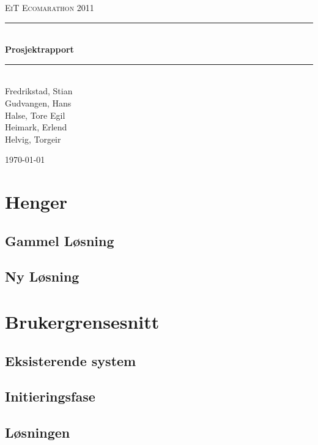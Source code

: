 \documentclass[a4paper,11pt]{report}
\newcommand{\HRule}{\rule{\linewidth}{0.5mm}}
\begin{document}
\begin{titlepage}

\begin{center}
\textsc{\LARGE EiT Ecomarathon 2011}\\[1.5cm]

\HRule \\[0.4cm]
{ \huge \bfseries Prosjektrapport}\\[0.4cm]
\HRule \\[1.5cm] 

Fredrikstad, Stian\\
Gudvangen, Hans\\
Halse, Tore Egil\\
Heimark, Erlend\\
Helvig, Torgeir\\

\vfill
 
{\large \today}

\end{center}
\end{titlepage}
\cleardoublepage
{}
\tableofcontents
\listoffigures
\listoftables
\clearpage
\chapter{Henger}
\section{Gammel Løsning}

\section{Ny Løsning}





\chapter{Brukergrensesnitt}
\section{Eksisterende system}

\newpage
\section{Initieringsfase}


\newpage
\section{Løsningen}


\appendix


\clearpage 
 
 
\end{document}
